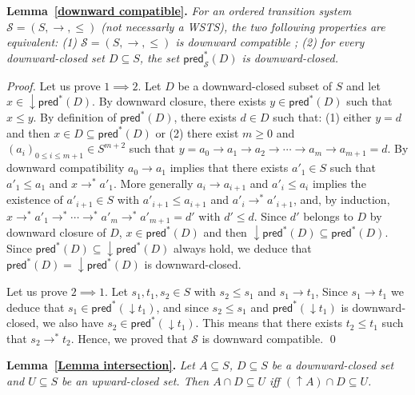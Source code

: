 \documentclass[runningheads]{llncs}
\newcommand{\pred}{\textsf{pred}}
\begin{document}
\noindent
\textbf{Lemma~\ref{downward compatible}.}
{\em For an ordered transition system $\mathscr{S}=(S, \rightarrow, \leq)$ (not necessarly a WSTS), the two following properties are equivalent: (1) $\mathscr{S}=(S, \rightarrow, \leq)$ is downward compatible ; (2) for every downward-closed set $D \subseteq S$, the set $\pred_{\mathscr{S}}^*(D)$ is downward-closed.}


\begin{proof}
Let us prove $1 \implies 2$. 
Let $D$ be a downward-closed subset of $S$
and let $x \in \mathop{\downarrow} \pred^*(D)$.
By downward closure, there exists
$y \in \pred^*(D)$ 
such that $x \leq y$.
By definition of $\pred^*(D)$, there exists 
$d \in D$ such that: (1) either $y=d$ and then $x \in D \subseteq \pred^*(D)$ or (2) there exist $m\geq 0$ and $(a_i)_{0 \leq i \leq m+1} \in S^{m+2}$ such that
$y = a_0 \to a_1 \to a_2 \to \cdots \to a_m \to a_{m+1} = d$.
%
By downward compatibility $a_0 \to a_1$
implies that there exists $a'_1 \in S$ such that $a'_1 \leq a_1$ and
$x \to^* a'_1$.
More generally $a_i \to a_{i+1}$ and
$a'_i\leq a_i$ implies the existence of $a'_{i+1} \in S$ with $a'_{i+1} \leq a_{i+1}$ and
$a'_i \to^* a'_{i+1}$,
and, by induction,
 $x \to^* a'_1 \to^* \cdots \to^* a'_{m} \to^* a'_{m+1} = d'$
with $d' \leq d$.
Since
$d'$ 
belongs to $D$ by downward closure of $D$, $x \in \pred^*(D)$ and then $\mathop{\downarrow}\pred^*(D) \subseteq \pred^*(D)$. Since $\pred^*(D) \subseteq \mathop{\downarrow} \pred^*(D)$ always hold, we deduce that $\pred^*(D)=\mathop{\downarrow}\pred^*(D)$ is downward-closed.

Let us prove $2 \implies 1$. Let $s_1, t_1 , s_2 \in S$ with $s_2 \leq s_1$  and $s_1 \rightarrow t_1$, Since $s_1 \rightarrow t_1$ we deduce that $s_1 \in \pred^*(\mathop{\downarrow} t_1)$, and since $s_2 \leq s_1$ and $\pred^*(\mathop{\downarrow} t_1)$ is downward-closed, we also have $s_2 \in \pred^*(\mathop{\downarrow} t_1)$. This means that there exists $t_2 \leq t_1$ such that 
$s_2 \rightarrow^{*} t_2$. Hence, we proved that $\mathscr{S}$ is downward compatible.
\qed
\end{proof}



\noindent
\textbf{Lemma~\ref{Lemma intersection}.}
{\em Let $A \subseteq S$, $D \subseteq S$ be a downward-closed set and $U \subseteq S$ be an upward-closed set. 
Then $A \cap D \subseteq U$  iff $ (\mathop{\uparrow}  A) \cap D \subseteq U$.
}
\end{document}
